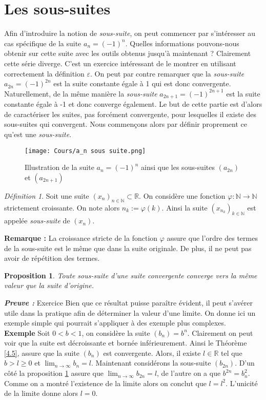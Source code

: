 \documentclass[oneside,12pt,french,table]{book}
\theoremstyle{definition}
\theoremstyle{plain}
\newtheorem{proposition}[definition]{Proposition}
\theoremstyle{remark}
\newtheorem{defi}[definition]{Définition}
\newcommand{\Nn}{{\mathbb{N}}}
\newcommand{\Rr}{{\mathbb{R}}}
\begin{document}
\section{Les sous-suites}
Afin d'introduire la notion de \textit{sous-suite}, on peut commencer par s'intéresser au cas spécifique de la suite $a_n = (-1)^n$. Quelles informations pouvons-nous obtenir sur cette suite avec les outils obtenus jusqu'à maintenant ? 
Clairement cette série diverge. C'est un exercice intéressant de le montrer en utilisant correctement la définition $\varepsilon$. On peut par contre remarquer que la \textit{sous-suite} $a_{2n} = (-1)^{2n}$ est la suite constante égale à 1 qui est donc convergente. Naturellement, de la même manière la \textit{sous-suite} $a_{2n+1} = (-1)^{2n+1}$ est la suite constante égale à -1 et donc converge également. Le but de cette partie est d'alors de caractériser les suites, pas forcément convergente, pour lesquelles il existe des sous-suites qui convergent. Nous commençons alors par définir proprement ce qu'est une \textit{sous-suite}.
\begin{figure}[H]
    \centering
    \texttt{[image: Cours/a\_n sous suite.png]}
    \caption{Illustration de la suite $a_n = (-1)^n$ ainsi que les sous-suites $(a_{2n})$ et $(a_{2n+1})$ }
    \label{fig:Cours/a_n sous suite.png}
\end{figure}

\begin{defi}
 Soit une suite $(x_n)_{ n \in \Nn } \subset \Rr $. On considère une fonction $\varphi : \Nn \rightarrow \Nn $ strictement croissante. On note alors $n_k := \varphi(k)$. Ainsi la suite $(x_{n_k})_{k \in \Nn} $ est appelée \textit{sous-suite} de  $(x_n)$. 
 \end{defi}
  
\textbf{Remarque :} La croissance stricte de la fonction $\varphi$ assure que l'ordre des termes de la sous-suite est le même que dans la suite originale. De plus, il ne peut pas avoir de répétition des termes. 


\begin{proposition}\label{2}
    Toute sous-suite d'une suite convergente converge vers la même valeur que la suite d'origine.  
\end{proposition}
\textit{\textbf{Preuve :}} Exercice 
\newline 
Bien que ce résultat puisse paraître évident, il peut s'avérer utile dans la pratique afin de déterminer la valeur d'une limite. On donne ici un exemple simple qui pourrait s'appliquer à des exemple plus complexes.\newline \\
\textbf{Exemple} Soit $0<b<1$, on considère la suite $(b_n) = b^n$. Clairement on peut voir que la suite est décroissante et bornée inférieurement. Ainsi le Théorème \ref{4.5}, assure que la suite $(b_n)$ est convergente. Alors, il existe  $l \in \Rr$ tel que $b > l \ge 0$ et $\lim_{n \to \infty} b_n = l$. Maintenant considérons la sous-suite $(b_{2n})$. D'un côté la proposition \ref{2} assure que $\lim_{n \to \infty} b_{2n} = l$, de l'autre on a que $b^{2n} = b_n^2$. Comme on a montré l'existence de la limite alors on conclut que $l = l^2$. L'unicité de la limite donne alors $l=0$. \\
\end{document}
